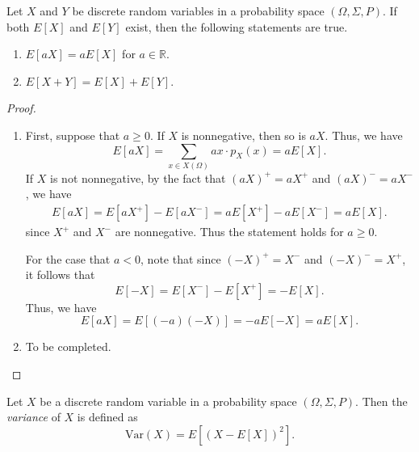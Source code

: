 \begin{theorem}
  Let $X$ and $Y$ be discrete random variables in a probability space
  $(\Omega, \Sigma, P)$.
  If both $E[X]$ and $E[Y]$ exist, then the following statements are true.
  \begin{enumerate}
    \item $E[aX] = aE[X]$ for $a \in \mathbb{R}$.
    \item $E[X + Y] = E[X] + E[Y]$.
  \end{enumerate}
\end{theorem}
\begin{proof} \leavevmode
  \begin{enumerate}
    \item First, suppose that $a \geq 0$. If $X$ is nonnegative, then
      so is $aX$. Thus, we have
      \begin{equation*}
        E[aX]
        = \sum_{x \in X(\Omega)} ax \cdot p_X(x)
        = aE[X].
      \end{equation*}
      If $X$ is not nonnegative, by the fact that $(aX)^+ = aX^+$ and
      $(aX)^- = aX^-$, we have
      \begin{align*}
        E[aX]
        = E[aX^+] - E[aX^-]
        = aE[X^+] - aE[X^-]
        = aE[X].
      \end{align*}
      since $X^+$ and $X^-$ are nonnegative.
      Thus the statement holds for $a \geq 0$.

      For the case that $a < 0$, note that since $(-X)^+ = X^-$ and
      $(-X)^- = X^+$, it follows that
      \begin{equation*}
        E[-X]
        = E[X^-] - E[X^+]
        = -E[X].
      \end{equation*}
      Thus, we have
      \begin{equation*}
        E[aX]
        = E[(-a)(-X)]
        = -aE[-X]
        = aE[X].
      \end{equation*}
    \item To be completed. \qedhere
  \end{enumerate}
\end{proof}

\begin{definition}
  Let $X$ be a discrete random variable in a probability space
  $(\Omega, \Sigma, P)$.
  Then the \emph{variance} of $X$ is defined as
  \begin{equation*}
    \mathrm{Var}(X) = E[(X - E[X])^2].
  \end{equation*}
\end{definition}

